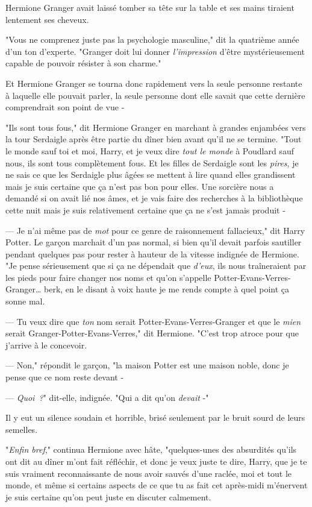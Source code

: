 Hermione Granger avait laissé tomber sa tête sur la table et ses mains tiraient lentement ses cheveux.

"Vous ne comprenez juste pas la psychologie masculine," dit la quatrième année d'un ton d'experte. "Granger doit lui donner \emph{l'impression} d'être mystérieusement capable de pouvoir résister à son charme."


Et Hermione Granger se tourna donc rapidement vers la seule personne restante à laquelle elle pouvait parler, la seule personne dont elle savait que cette dernière comprendrait son point de vue -

"Ils sont tous fous," dit Hermione Granger en marchant à grandes enjambées vers la tour Serdaigle après être partie du dîner bien avant qu'il ne se termine. "Tout le monde sauf toi et moi, Harry, et je veux dire \emph{tout le monde} à Poudlard sauf nous, ils sont tous complètement fous. Et les filles de Serdaigle sont les \emph{pires}, je ne sais ce que les Serdaigle plus âgées se mettent à lire quand elles grandissent mais je suis certaine que ça n'est pas bon pour elles. Une sorcière nous a demandé si on avait lié nos âmes, et je vais faire des recherches à la bibliothèque cette nuit mais je suis relativement certaine que ça ne s'est jamais produit -

--- Je n'ai même pas de \emph{mot} pour ce genre de raisonnement fallacieux," dit Harry Potter. Le garçon marchait d'un pas normal, si bien qu'il devait parfois sautiller pendant quelques pas pour rester à hauteur de la vitesse indignée de Hermione. "Je pense sérieusement que si ça ne dépendait que \emph{d'eux}, ils nous traîneraient par les pieds pour faire changer nos noms et qu'on s'appelle Potter-Evans-Verres-Granger… berk, en le disant à voix haute je me rends compte à quel point ça sonne mal.

--- Tu veux dire que \emph{ton} nom serait Potter-Evans-Verres-Granger et que le \emph{mien} serait Granger-Potter-Evans-Verres," dit Hermione. "C'est trop atroce pour que j'arrive à le concevoir.

--- Non," répondit le garçon, "la maison Potter est une maison noble, donc je pense que ce nom reste devant -

--- \emph{Quoi~?}" dit-elle, indignée. "Qui a dit qu'on \emph{devait} -"

Il y eut un silence soudain et horrible, brisé seulement par le bruit sourd de leurs semelles.

"\emph{Enfin bref}," continua Hermione avec hâte, "quelques-unes des absurdités qu'ils ont dit au dîner m'ont fait réfléchir, et donc je veux juste te dire, Harry, que je te suis vraiment reconnaissante de nous avoir sauvés d'une raclée, moi et tout le monde, et même si certains aspects de ce que tu as fait cet après-midi m'énervent je suis certaine qu'on peut juste en discuter calmement.

